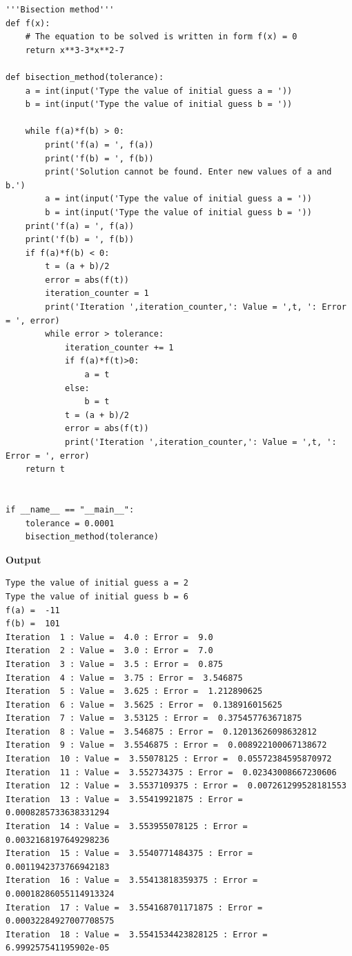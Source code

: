 \documentclass[a4paper,11pt]{book}
\begin{document}
\begin{lstlisting}
'''Bisection method'''
def f(x):
    # The equation to be solved is written in form f(x) = 0
    return x**3-3*x**2-7

def bisection_method(tolerance):
    a = int(input('Type the value of initial guess a = '))
    b = int(input('Type the value of initial guess b = '))
    
    while f(a)*f(b) > 0:
        print('f(a) = ', f(a))
        print('f(b) = ', f(b))
        print('Solution cannot be found. Enter new values of a and b.')
        a = int(input('Type the value of initial guess a = '))
        b = int(input('Type the value of initial guess b = '))
    print('f(a) = ', f(a))
    print('f(b) = ', f(b))
    if f(a)*f(b) < 0:
        t = (a + b)/2
        error = abs(f(t))
        iteration_counter = 1
        print('Iteration ',iteration_counter,': Value = ',t, ': Error = ', error)
        while error > tolerance:
            iteration_counter += 1
            if f(a)*f(t)>0: 
                a = t
            else:
                b = t          
            t = (a + b)/2
            error = abs(f(t))
            print('Iteration ',iteration_counter,': Value = ',t, ': Error = ', error)
    return t


if __name__ == "__main__":
    tolerance = 0.0001
    bisection_method(tolerance)
\end{lstlisting}
\textbf{Output}
\begin{lstlisting}
Type the value of initial guess a = 2
Type the value of initial guess b = 6
f(a) =  -11
f(b) =  101
Iteration  1 : Value =  4.0 : Error =  9.0
Iteration  2 : Value =  3.0 : Error =  7.0
Iteration  3 : Value =  3.5 : Error =  0.875
Iteration  4 : Value =  3.75 : Error =  3.546875
Iteration  5 : Value =  3.625 : Error =  1.212890625
Iteration  6 : Value =  3.5625 : Error =  0.138916015625
Iteration  7 : Value =  3.53125 : Error =  0.375457763671875
Iteration  8 : Value =  3.546875 : Error =  0.12013626098632812
Iteration  9 : Value =  3.5546875 : Error =  0.008922100067138672
Iteration  10 : Value =  3.55078125 : Error =  0.05572384595870972
Iteration  11 : Value =  3.552734375 : Error =  0.02343008667230606
Iteration  12 : Value =  3.5537109375 : Error =  0.007261299528181553
Iteration  13 : Value =  3.55419921875 : Error =  0.0008285733638331294
Iteration  14 : Value =  3.553955078125 : Error =  0.0032168197649298236
Iteration  15 : Value =  3.5540771484375 : Error =  0.0011942373766942183
Iteration  16 : Value =  3.55413818359375 : Error =  0.00018286055114913324
Iteration  17 : Value =  3.554168701171875 : Error =  0.00032284927007708575
Iteration  18 : Value =  3.5541534423828125 : Error =  6.999257541195902e-05
\end{lstlisting}
\end{document}

